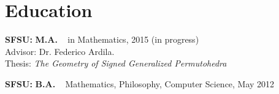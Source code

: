  \section{\sc Education} 
\begin{list1}
\item  {\bf SFSU:}  \textbf{M.A.} ~ in Mathematics, 2015 (in progress) \\
Advisor: Dr. Federico Ardila. \\
 Thesis: {\em The Geometry of Signed Generalized Permutohedra} 


\item  {\bf SFSU:}  \textbf{B.A.} ~ Mathematics, Philosophy, Computer Science, May 2012 

\end{list1}